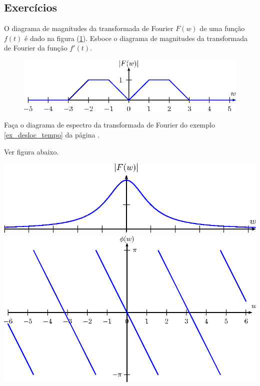 \subsection*{Exercícios}
\begin{exer}O diagrama de magnitudes da transformada de Fourier $F(w)$ de uma função $f(t)$ é dado na figura (\ref{fig_graf_1}). Esboce o diagrama de magnitudes da transformada de Fourier da função $f'(t)$. 
\begin{figure}[!ht]
\begin{center}
\includegraphics{cap_propriedades_transformada/pics/figura_1}\end{center}
\caption{\label{fig_graf_1}}
\end{figure}
\end{exer}
\begin{exer}Faça o diagrama de espectro da transformada de Fourier do exemplo \ref{ex_desloc_tempo} da página \pageref{ex_desloc_tempo}.
\end{exer}
\begin{resp}Ver figura abaixo.
\begin{center}
\includegraphics{cap_propriedades_transformada/pics/figura_11}
\includegraphics{cap_propriedades_transformada/pics/figura_12}\end{center}
\end{resp}
